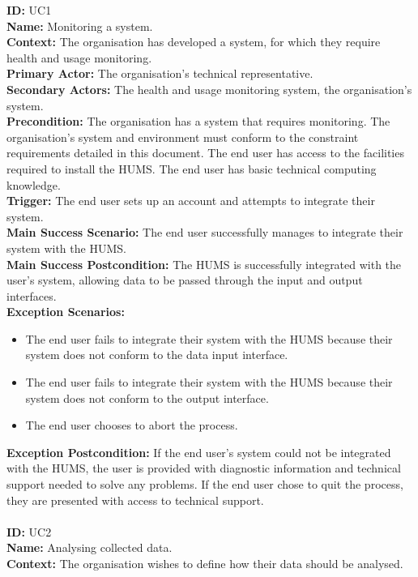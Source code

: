 \documentclass[10pt,a4paper]{article}
\begin{document}
\noindent \textbf{ID:} UC1\\
\textbf{Name:} Monitoring a system.\\
\textbf{Context:} The organisation has developed a system, for which they
require health and usage monitoring.\\
\textbf{Primary Actor:} The organisation's technical representative.\\
\textbf{Secondary Actors:} The health and usage monitoring system, the
organisation's system.\\
\textbf{Precondition:}  The organisation has a system that requires monitoring.
The organisation's system and environment must conform to the constraint
requirements detailed in this document. The end user has access to the
facilities required to install the HUMS. The end user has basic technical
computing knowledge.\\
\textbf{Trigger:} The end user sets up an account and attempts to integrate
their system.\\
\textbf{Main Success Scenario:} The end user successfully manages to integrate
their system with the HUMS.\\
\textbf{Main Success Postcondition:} The HUMS is successfully integrated with
the user's system, allowing data to be passed through the input and output
interfaces.\\
\textbf{Exception Scenarios:}
\begin{itemize}
\item The end user fails to integrate their system with the HUMS because their
system does not conform to the data input interface.
\item The end user fails to integrate their system with the HUMS because their
system does not conform to the output interface.
\item The end user chooses to abort the process.
\end{itemize}
\textbf{Exception Postcondition:} If the end user's system could not be
integrated with the HUMS, the user is provided with diagnostic information and
technical support needed to solve any problems. If the end user chose to quit
the process, they are presented with access to technical support.\\\\
\noindent \textbf{ID:} UC2\\
\textbf{Name:} Analysing collected data.\\
\textbf{Context:} The organisation wishes to define how their data should be
analysed.\\
\end{document}
